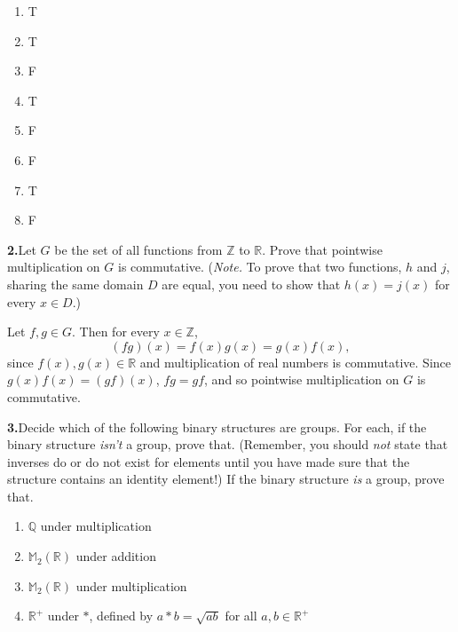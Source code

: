 \documentclass[10pt,]{book}
\theoremstyle{plain}
\theoremstyle{definition}
\theoremstyle{definition}
\theoremstyle{definition}
\theoremstyle{definition}
\numberwithin{equation}{section}
\def\Z{\mathbb{Z}}
\def\R{\mathbb{R}}
\def\Q{\mathbb{Q}}
\def\M{\mathbb{M}}
\begin{document}
\leavevmode%
\begin{multicols}{4}
\begin{enumerate}[label=(\alph*)]
\item\hypertarget{li-106}{}T%
\item\hypertarget{li-107}{}T%
\item\hypertarget{li-108}{}F%
\item\hypertarget{li-109}{}T%
\item\hypertarget{li-110}{}F%
\item\hypertarget{li-111}{}F%
\item\hypertarget{li-112}{}T%
\item\hypertarget{li-113}{}F%
\end{enumerate}
\end{multicols}
\par\smallskip
\noindent\textbf{2.}\quad{}Let \(G\) be the set of all functions from \(\Z\) to \(\R\). Prove that pointwise multiplication on \(G\) is commutative. (\emph{Note.} To prove that two functions, \(h\) and \(j\), sharing the same domain \(D\) are equal, you need to show that \(h(x)=j(x)\) for every \(x\in D\).)%
\par\smallskip
Let \(f,g\in G\). Then for every \(x\in \Z\),%
\begin{equation*}
(fg)(x)=f(x)g(x)=g(x)f(x),
\end{equation*}
since \(f(x), g(x)\in \R\) and multiplication of real numbers is commutative. Since \(g(x)f(x)=(gf)(x)\), \(fg=gf\), and so pointwise multiplication on \(G\) is commutative.%
\par\smallskip
\noindent\textbf{3.}\quad{}Decide which of the following binary structures are groups. For each, if the binary structure \emph{isn't} a group, prove that. (Remember, you should \emph{not} state that inverses do or do not exist for elements until you have made sure that the structure contains an identity element!) If the binary structure \emph{is} a group, prove that. \leavevmode%
\begin{enumerate}[label=(\alph*)]
\item\hypertarget{li-114}{}\(\Q\) under multiplication%
\item\hypertarget{li-115}{}\(\M_2(\R)\) under addition%
\item\hypertarget{li-116}{}\(\M_2(\R)\) under multiplication%
\item\hypertarget{li-117}{}\(\R^+\) under \(*\), defined by \(a*b=\sqrt{ab}\) for all \(a,b\in \R^+\)%
\end{enumerate}
\end{document}
